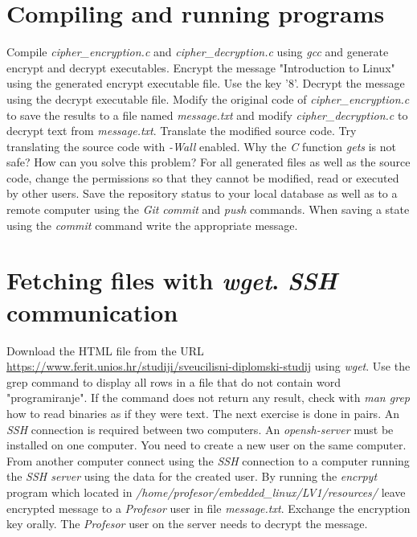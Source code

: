 \documentclass[11pt]{article}
\begin{document}
\section{Compiling and running programs}
Compile \textit{cipher\_encryption.c} and \textit{cipher\_decryption.c} using
 \textit{gcc} and generate encrypt and decrypt executables. Encrypt the message
 "Introduction to Linux" using the generated encrypt executable file. Use the
 key '8'. Decrypt the message using the decrypt executable file. Modify the
 original code of \textit{cipher\_encryption.c} to save the results to a file
 named \textit{message.txt} and modify \textit{cipher\_decryption.c} to
 decrypt text from \textit{message.txt}. Translate the modified source code.
\newline
\newline
Try translating the source code with \textit{-Wall} enabled. Why the \textit{C}
 function \textit{gets} is not safe? How can you solve this problem?
\newline
\newline
 For all generated files as well as the source code, change the permissions so
that they cannot be modified, read or executed by other users.
\newline
\newline
Save the repository status to your local database as well as to a remote
 computer using the \textit{Git} \textit{commit} and \textit{push} commands.
 When saving a state using the \textit{commit} command write the appropriate
 message.
\section{Fetching files with \textit{wget}. \textit{SSH} communication}
Download the HTML file from the URL
 \url{https://www.ferit.unios.hr/studiji/sveucilisni-diplomski-studij} using
 \textit{wget}. Use the grep command to display all rows in a file that
 do not contain word "programiranje". If the command does not return any
 result, check with \textit{man grep} how to read binaries as if they were
 text.
\newline
\newline
The next exercise is done in pairs. An \textit{SSH} connection is required
 between two computers. An \textit{opensh-server} must be installed on one
 computer. You need to create a new user on the same computer. From another
 computer connect using the \textit{SSH} connection to a computer running the
\textit{SSH server} using the data for the created user. By running the
\textit{encrpyt} program which located in
\textit{/home/profesor/embedded\_linux/LV1/resources/} leave encrypted message
 to a \textit{Profesor} user in file \textit{message.txt}. Exchange the encryption
key orally. The \textit{Profesor} user on the server needs to decrypt the message.
\end{document}
